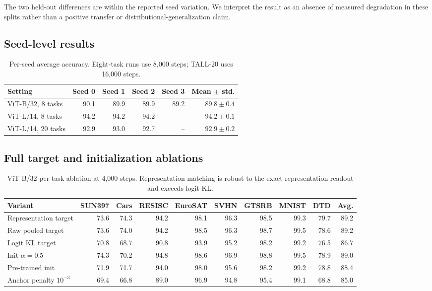 \documentclass[letterpaper]{article} %
\theoremstyle{plain}
\theoremstyle{definition}
\begin{document}
The two held-out differences are within the reported seed variation. We interpret the
result as an absence of measured degradation in these splits rather than a positive
transfer or distributional-generalization claim.

\subsection{Seed-level results}
\label{app:seeds}

\begin{table}[tb]
\centering
{\small
\begin{tabular}{lrrrrr}
\toprule
Setting & Seed 0 & Seed 1 & Seed 2 & Seed 3 & Mean $\pm$ std. \\
\midrule
ViT-B/32, 8 tasks & 90.1 & 89.9 & 89.9 & 89.2 & $89.8\pm0.4$ \\
ViT-L/14, 8 tasks & 94.2 & 94.2 & 94.2 & -- & $94.2\pm0.1$ \\
ViT-L/14, 20 tasks & 92.9 & 93.0 & 92.7 & -- & $92.9\pm0.2$ \\
\bottomrule
\end{tabular}
}
\caption{Per-seed average accuracy. Eight-task runs use 8,000 steps; TALL-20 uses
16,000 steps.}
\label{tab:seeds}
\end{table}

\subsection{Full target and initialization ablations}
\label{app:ablation}

\begin{table}[tb]
\centering
{\small
\begin{tabular*}{\textwidth}{@{\extracolsep{\fill}}lrrrrrrrrr}
\toprule
Variant & SUN397 & Cars & RESISC & EuroSAT & SVHN & GTSRB & MNIST & DTD & Avg. \\
\midrule
Representation target & 73.6 & 74.3 & 94.2 & 98.1 & 96.3 & 98.5 & 99.3 & 79.7 & 89.2 \\
Raw pooled target & 73.6 & 74.0 & 94.2 & 98.5 & 96.3 & 98.7 & 99.5 & 78.6 & 89.2 \\
Logit KL target & 70.8 & 68.7 & 90.8 & 93.9 & 95.2 & 98.2 & 99.2 & 76.5 & 86.7 \\
Init $\alpha=0.5$ & 74.3 & 70.2 & 94.8 & 98.6 & 96.9 & 98.8 & 99.5 & 78.9 & 89.0 \\
Pre-trained init & 71.9 & 71.7 & 94.0 & 98.0 & 95.6 & 98.2 & 99.2 & 78.8 & 88.4 \\
Anchor penalty $10^{-3}$ & 69.4 & 66.8 & 89.0 & 96.9 & 94.8 & 95.4 & 99.1 & 68.8 & 85.0 \\
\bottomrule
\end{tabular*}
}
\caption{ViT-B/32 per-task ablation at 4,000 steps. Representation matching is robust to
the exact representation readout and exceeds logit KL.}
\label{tab:ablation-full}
\end{table}
\end{document}
